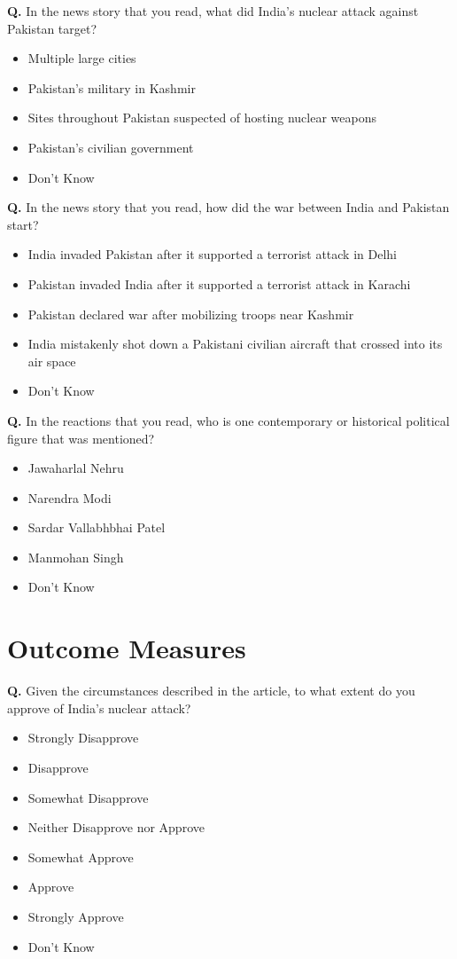 \documentclass[12pt]{article}
\newcounter{qnum}
\newcommand{\question}[1]{%
  \stepcounter{qnum}%
  \noindent\textbf{Q\thequnum.} #1\par\medskip
}
\newcommand{\choices}[1]{%
  \begin{itemize}[leftmargin=2em, itemsep=2pt, topsep=2pt]
    #1
  \end{itemize}\medskip
}
\newcommand{\likert}[1]{%
  \begin{itemize}[leftmargin=2em, itemsep=2pt, topsep=2pt]
    #1
  \end{itemize}\medskip
}
\begin{document}
\question{In the news story that you read, what did India's nuclear attack against Pakistan target?}
\choices{
  \item Multiple large cities
  \item Pakistan's military in Kashmir
  \item Sites throughout Pakistan suspected of hosting nuclear weapons
  \item Pakistan's civilian government
  \item Don't Know
}

\question{In the news story that you read, how did the war between India and Pakistan start?}
\choices{
  \item India invaded Pakistan after it supported a terrorist attack in Delhi
  \item Pakistan invaded India after it supported a terrorist attack in Karachi
  \item Pakistan declared war after mobilizing troops near Kashmir
  \item India mistakenly shot down a Pakistani civilian aircraft that crossed into its air space
  \item Don't Know
}

\question{In the reactions that you read, who is one contemporary or historical political figure that was mentioned?}
\choices{
  \item Jawaharlal Nehru
  \item Narendra Modi
  \item Sardar Vallabhbhai Patel
  \item Manmohan Singh
  \item Don't Know
}

\section{Outcome Measures}

\question{Given the circumstances described in the article, to what extent do you approve of India's nuclear attack?}
\likert{
  \item Strongly Disapprove
  \item Disapprove
  \item Somewhat Disapprove
  \item Neither Disapprove nor Approve
  \item Somewhat Approve
  \item Approve
  \item Strongly Approve
  \item Don't Know
}
\end{document}
